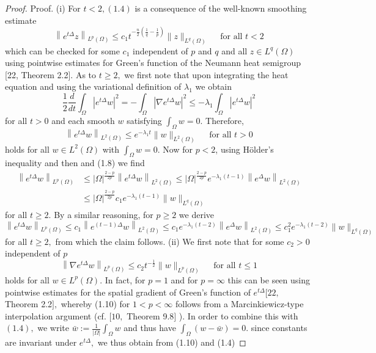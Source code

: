 \begin{proof}
	Proof. (i) For $t<2,(1.4)$ is a consequence of the well-known smoothing estimate
	$$
	\left\|e^{t \Delta} z\right\|_{L^{p}(\Omega)} \leqslant c_{1} t^{-\frac{n}{2}\left(\frac{1}{q}-\frac{1}{p}\right)}\|z\|_{L^{q}(\Omega)} \quad \text { for all } t<2
	$$
	which can be checked for some $c_{1}$ independent of $p$ and $q$ and all $z \in L^{q}(\Omega)$ using pointwise estimates for Green's function of the Neumann heat semigroup [22, Theorem 2.2]. As to $t \geqslant 2,$ we first note that upon integrating the heat equation and using the variational definition of $\lambda_{1}$ we obtain
	$$
	\frac{1}{2} \frac{d}{d t} \int_{\Omega}\left|e^{t \Delta} w\right|^{2}=-\int_{\Omega}\left|\nabla e^{t \Delta} w\right|^{2} \leqslant-\lambda_{1} \int_{\Omega}\left|e^{t \Delta} w\right|^{2}
	$$
	for all $t>0$ and each smooth $w$ satisfying $\int_{\Omega} w=0 .$ Therefore,
	$$
	\left\|e^{t \Delta} w\right\|_{L^{2}(\Omega)} \leqslant e^{-\lambda_{1} t}\|w\|_{L^{2}(\Omega)} \quad \text { for all } t>0
	$$
	holds for all $w \in L^{2}(\Omega)$ with $\int_{\Omega} w=0$. 
	Now for $p<2$, using H\"older's inequality and then and (1.8) we find
	$$
	\begin{aligned}
		\left\|e^{t \Delta} w\right\|_{L^{p}(\Omega)} & \leqslant|\Omega|^{\frac{2-p}{2 p}}\left\|e^{t \Delta} w\right\|_{L^{2}(\Omega)} \leqslant|\Omega|^{\frac{2-p}{2 p}} e^{-\lambda_{1}(t-1)}\left\|e^{\Delta} w\right\|_{L^{2}(\Omega)} \\
		& \leqslant|\Omega|^{\frac{2-p}{2 p}} c_{1} e^{-\lambda_{1}(t-1)}\|w\|_{L^{q}(\Omega)}
	\end{aligned}
	$$
	for all $t \geqslant 2 .$ By a similar reasoning, for $p \geqslant 2$ we derive
	$$
	\left\|e^{t \Delta} w\right\|_{L^{p}(\Omega)} \leqslant c_{1}\left\|e^{(t-1) \Delta} w\right\|_{L^{2}(\Omega)} \leqslant c_{1} e^{-\lambda_{1}(t-2)}\left\|e^{\Delta} w\right\|_{L^{2}(\Omega)} \leqslant c_{1}^{2} e^{-\lambda_{1}(t-2)}\|w\|_{L^{q}(\Omega)}
	$$
	for all $t \geqslant 2,$ from which the claim follows.
	(ii) We first note that for some $c_{2}>0$ independent of $p$
	$$
	\left\|\nabla e^{t \Delta} w\right\|_{L^{p}(\Omega)} \leqslant c_{2} t^{-\frac{1}{2}}\|w\|_{L^{p}(\Omega)} \quad \text { for all } t \leqslant 1
	$$
	holds for all $w \in L^{p}(\Omega) .$ In fact, for $p=1$ and for $p=\infty$ this can be seen using pointwise estimates for the spatial gradient of Green's function of $e^{t \Delta}[22,$ Theorem 2.2$],$ whereby (1.10) for $1<p<\infty$ follows from a Marcinkiewicz-type interpolation argument (cf. $[10,$ Theorem 9.8$]$ ). In order to combine this with $(1.4),$ we write $\bar{w}:=\frac{1}{|\Omega|} \int_{\Omega} w$ and thus have $\int_{\Omega}(w-\bar{w})=0 .$ since constants are invariant under $e^{t \Delta},$ we thus obtain from (1.10) and (1.4)
	

\end{proof}
